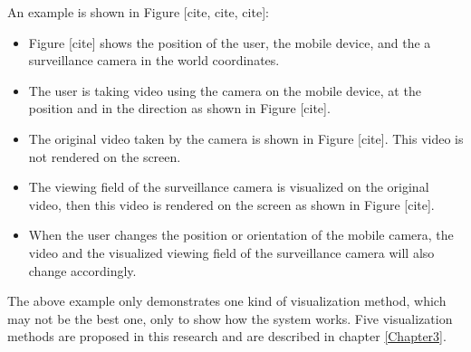 An example is shown in Figure [cite, cite, cite]:
\begin{itemize}
\item Figure [cite] shows the position of the user, the mobile device, and the a surveillance camera in the world coordinates.
\item The user is taking video using the camera on the mobile device, at the position and in the direction as shown in Figure [cite].
\item The original video taken by the camera is shown in Figure [cite]. This video is not rendered on the screen.
\item The viewing field of the surveillance camera is visualized on the original video, then this video is rendered on the screen as shown in Figure [cite].
\item When the user changes the position or orientation of the mobile camera, the video and the visualized viewing field of the surveillance camera will also change accordingly.
\end{itemize}

The above example only demonstrates one kind of visualization method, which may not be the best one, only to show how the system works. Five visualization methods are proposed in this research and are described in chapter \ref{Chapter3}.
